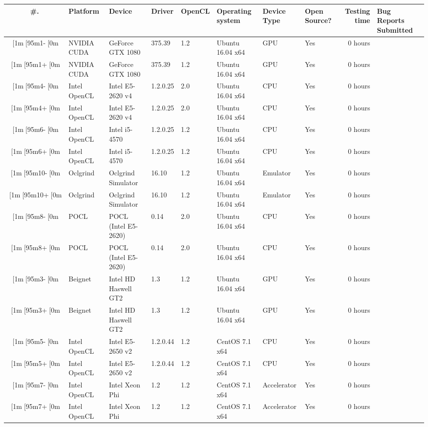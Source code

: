 \begin{tabular}{ cllllllL{1cm} | rR{1.4cm} }
\toprule
\textbf{\#. } & \textbf{Platform} & \textbf{Device} & \textbf{Driver} & \textbf{OpenCL} & 
\textbf{Operating system} & \textbf{Device Type} & \textbf{Open Source?} & \textbf{Testing time} & \textbf{Bug Reports Submitted} \\
\midrule
[1m[95m1-[0m & NVIDIA CUDA & GeForce GTX 1080 & 375.39 & 1.2 & Ubuntu 16.04 x64 & GPU & Yes & 0 hours \\
[1m[95m1+[0m & NVIDIA CUDA & GeForce GTX 1080 & 375.39 & 1.2 & Ubuntu 16.04 x64 & GPU & Yes & 0 hours \\
[1m[95m4-[0m & Intel OpenCL & Intel E5-2620 v4 & 1.2.0.25 & 2.0 & Ubuntu 16.04 x64 & CPU & Yes & 0 hours \\
[1m[95m4+[0m & Intel OpenCL & Intel E5-2620 v4 & 1.2.0.25 & 2.0 & Ubuntu 16.04 x64 & CPU & Yes & 0 hours \\
[1m[95m6-[0m & Intel OpenCL & Intel i5-4570 & 1.2.0.25 & 1.2 & Ubuntu 16.04 x64 & CPU & Yes & 0 hours \\
[1m[95m6+[0m & Intel OpenCL & Intel i5-4570 & 1.2.0.25 & 1.2 & Ubuntu 16.04 x64 & CPU & Yes & 0 hours \\
[1m[95m10-[0m & Oclgrind & Oclgrind Simulator & 16.10 & 1.2 & Ubuntu 16.04 x64 & Emulator & Yes & 0 hours \\
[1m[95m10+[0m & Oclgrind & Oclgrind Simulator & 16.10 & 1.2 & Ubuntu 16.04 x64 & Emulator & Yes & 0 hours \\
[1m[95m8-[0m & POCL & POCL (Intel E5-2620) & 0.14 & 2.0 & Ubuntu 16.04 x64 & CPU & Yes & 0 hours \\
[1m[95m8+[0m & POCL & POCL (Intel E5-2620) & 0.14 & 2.0 & Ubuntu 16.04 x64 & CPU & Yes & 0 hours \\
[1m[95m3-[0m & Beignet & Intel HD Haswell GT2 & 1.3 & 1.2 & Ubuntu 16.04 x64 & GPU & Yes & 0 hours \\
[1m[95m3+[0m & Beignet & Intel HD Haswell GT2 & 1.3 & 1.2 & Ubuntu 16.04 x64 & GPU & Yes & 0 hours \\
[1m[95m5-[0m & Intel OpenCL & Intel E5-2650 v2 & 1.2.0.44 & 1.2 & CentOS 7.1 x64 & CPU & Yes & 0 hours \\
[1m[95m5+[0m & Intel OpenCL & Intel E5-2650 v2 & 1.2.0.44 & 1.2 & CentOS 7.1 x64 & CPU & Yes & 0 hours \\
[1m[95m7-[0m & Intel OpenCL & Intel Xeon Phi & 1.2 & 1.2 & CentOS 7.1 x64 & Accelerator & Yes & 0 hours \\
[1m[95m7+[0m & Intel OpenCL & Intel Xeon Phi & 1.2 & 1.2 & CentOS 7.1 x64 & Accelerator & Yes & 0 hours \\

\end{tabular}
